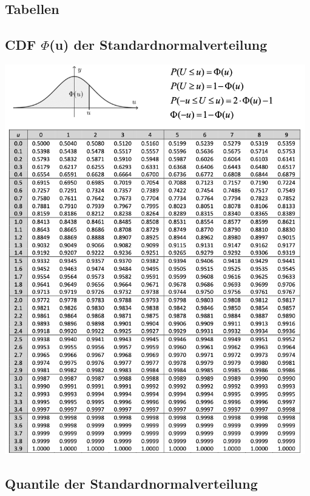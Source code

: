 \documentclass[8pt,a4paper]{scrartcl}
\begin{document}
\begin{multicols*}{2}

\section{Tabellen}
	\subsection{CDF $\Phi$(u) der Standardnormalverteilung}

		\includegraphics[height=17cm]{img/Standardnormalverteilung.png}

	\subsection{Quantile der Standardnormalverteilung}


\end{multicols*}
\end{document}
